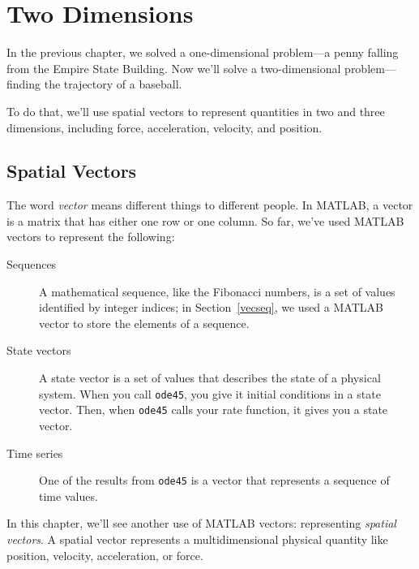 \chapter{Two Dimensions}


In the previous chapter, we solved a one-dimensional problem---a penny falling from the Empire State Building.  Now we'll solve a two-dimensional problem---finding the trajectory of a baseball.


To do that, we'll use spatial vectors to represent quantities in two and three dimensions, including force, acceleration, velocity, and position.

\section{Spatial Vectors}
\label{spacial}

The word \emph{vector} means different
things to different people.  In MATLAB, a vector is a matrix that has
either one row or one column.  So far, we've used MATLAB vectors to
represent the following:

\begin{description}

\item[Sequences] A mathematical sequence, like the Fibonacci numbers, is a set of values identified by integer indices; in Section~\ref{vecseq}, we used a MATLAB vector to store the elements of a sequence.

\item[State vectors] A state vector is a set of values that
describes the state of a physical system.  When you call
\lstinline{ode45}, you give it initial conditions in a state
vector.  Then, when \lstinline{ode45} calls your rate function, it
gives you a state vector.

\item[Time series] One of the results from \lstinline{ode45} is a vector that represents a sequence of time values.

\end{description}


In this chapter, we'll see another use of MATLAB vectors: representing
\emph{spatial vectors}.  A spatial vector represents a multidimensional physical quantity like position, velocity, acceleration, or force.

